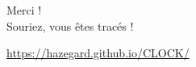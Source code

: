 \documentclass[aspectratio=1610, twocolumn, handout]{beamer}%
\begin{document}
\framered


\framepink


\frameblue


\framegreen
\begin{frame}[plain]
  \begin{minipage}{\linewidth-\beamerleftmargin+\beamerrightmargin}
    \begin{block}{}
      \vspace{0.5cm}
      \begin{center}
        {\LARGE{Merci !}}\\
        \pause
        Souriez, vous êtes tracés !
      \end{center}
      \vspace{0.25cm}
  \end{block}
  \bigbreak
  \pause
  \centering
  \url{https://hazegard.github.io/CLOCK/}
  \end{minipage}
\end{frame}
\end{document}
